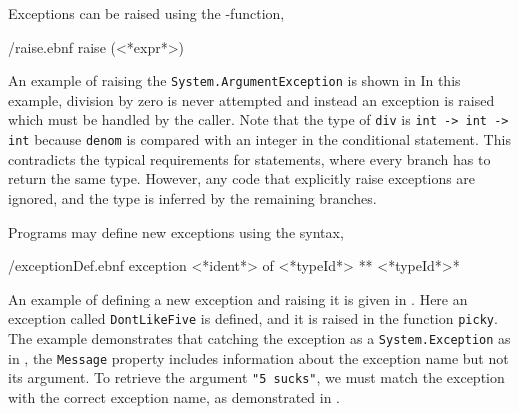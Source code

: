\documentclass[fsharpnotes.tex]{subfiles}
\begin{document}
Exceptions can be raised using the -function,
%
\begin{verbatimwrite}{\ebnf/raise.ebnf}
raise (<*expr*>)
\end{verbatimwrite}
%
An example of raising the \lstinline{System.ArgumentException} is shown in 
% 
%
In this example, division by zero is never attempted and instead an exception is raised which must be handled by the caller. Note that the type of \lstinline!div! is \lstinline!int -> int -> int! because \lstinline{denom} is compared with an integer in the conditional statement. This contradicts the typical requirements for  statements, where every branch has to return the same type. However, any code that explicitly raise exceptions are ignored, and the type is inferred by the remaining branches.

Programs may define new exceptions using the syntax,
%
\begin{verbatimwrite}{\ebnf/exceptionDef.ebnf}
exception <*ident*> of <*typeId*> {** <*typeId*>*} 
\end{verbatimwrite}
%
An example of defining a new exception and raising it is given in .
%
%
Here an exception called \lstinline!DontLikeFive! is defined, and it is raised in the function \lstinline!picky!. The example demonstrates that catching the exception as a \lstinline{System.Exception} as in , the \lstinline{Message} property includes information about the exception name but not its argument. To retrieve the argument \lstinline{"5 sucks"}, we must match the exception with the correct exception name, as demonstrated in . 
%
%
\end{document}

